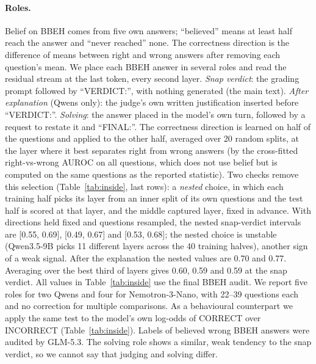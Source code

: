 \documentclass[11pt]{article}
\begin{document}
\paragraph{Roles.} Belief on BBEH comes from five own answers; ``believed'' means at least half reach the answer and
``never reached'' none. The correctness direction is the difference of means between right and wrong answers after
removing each question's mean. We place each BBEH answer in several roles and read the residual stream at the last
token, every second layer. \emph{Snap verdict}: the grading prompt followed by ``VERDICT:'', with nothing generated (the main
text). \emph{After explanation} (Qwens only): the judge's own written justification inserted before ``VERDICT:''.
\emph{Solving}: the answer placed in the model's own turn, followed by a request to restate it and ``FINAL:''. The
correctness direction is learned on half of the questions and applied to the other half, averaged over 20 random
splits, at the layer where it best separates right from wrong answers (by the cross-fitted right-vs-wrong AUROC on
all questions, which does not use belief but is computed on the same questions as the reported statistic). Two checks
remove this selection (Table~\ref{tab:inside}, last rows): a \emph{nested} choice, in which each training half picks
its layer from an inner split of its own questions and the test half is scored at that layer, and the middle captured
layer, fixed in advance. With directions held fixed and questions resampled, the nested snap-verdict intervals are
[0.55, 0.69], [0.49, 0.67] and [0.53, 0.68]; the nested choice is unstable (Qwen3.5-9B picks 11 different layers across
the 40 training halves), another sign of a weak signal. After the explanation the nested values are 0.70 and 0.77. Averaging over the best third of layers gives 0.60, 0.59 and 0.59 at the snap
verdict. All values in Table~\ref{tab:inside} use the final BBEH audit. We report five roles for two Qwens and four for Nemotron-3-Nano, with 22--39 questions each and no
correction for multiple comparisons. As a behavioural counterpart we apply the
same test to the model's own log-odds of CORRECT over INCORRECT (Table~\ref{tab:inside}). Labels of believed wrong
BBEH answers were audited by GLM-5.3. The solving role shows a similar, weak tendency to the snap verdict, so we
cannot say that judging and solving differ.
\end{document}
